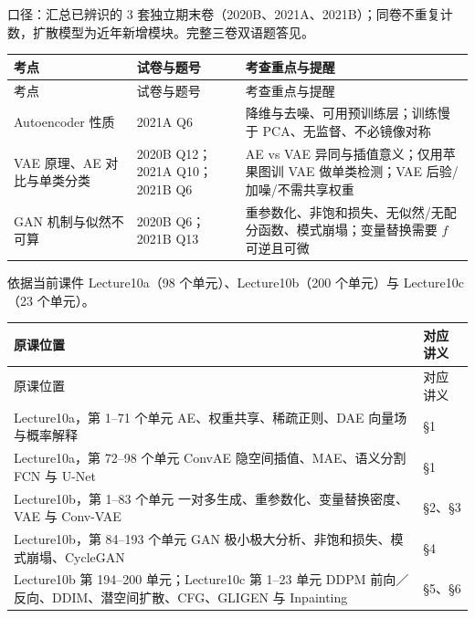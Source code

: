 
口径：汇总已辨识的 3 套独立期末卷（2020B、2021A、2021B）；同卷不重复计数，扩散模型为近年新增模块。完整三卷双语题答见。

\begingroup\small\setlength{\tabcolsep}{3pt}\renewcommand{\arraystretch}{1.22}
\begin{longtable}{@{}>{\raggedright\arraybackslash}p{}>{\raggedright\arraybackslash}p{}>{\raggedright\arraybackslash}p{}@{}}
\toprule
考点 & 试卷与题号 & 考查重点与提醒 \\
\midrule\endfirsthead
考点 & 试卷与题号 & 考查重点与提醒 \\
\midrule\endhead
\bottomrule\endfoot
Autoencoder 性质 & 2021A Q6 & 降维与去噪、可用预训练层；训练慢于 PCA、无监督、不必镜像对称 \\
VAE 原理、AE 对比与单类分类 & 2020B Q12；2021A Q10；2021B Q6 & AE vs VAE 异同与插值意义；仅用苹果图训 VAE 做单类检测；VAE 后验/加噪/不需共享权重 \\
GAN 机制与似然不可算 & 2020B Q6；2021B Q13 & 重参数化、非饱和损失、无似然/无配分函数、模式崩塌；变量替换需要 $f$ 可逆且可微 \\
\end{longtable}\endgroup



依据当前课件 Lecture10a（98 个单元）、Lecture10b（200 个单元）与 Lecture10c（23 个单元）。

\begingroup\small\setlength{\tabcolsep}{3pt}\renewcommand{\arraystretch}{1.22}
\begin{longtable}{@{}>{\raggedright\arraybackslash}p{}>{\raggedright\arraybackslash}p{}@{}}
\toprule
原课位置 & 对应讲义 \\
\midrule\endfirsthead
原课位置 & 对应讲义 \\
\midrule\endhead
\bottomrule\endfoot
Lecture10a，第 1–71 个单元 AE、权重共享、稀疏正则、DAE 向量场与概率解释 & §1 \\
Lecture10a，第 72–98 个单元 ConvAE 隐空间插值、MAE、语义分割 FCN 与 U-Net & §1 \\
Lecture10b，第 1–83 个单元 一对多生成、重参数化、变量替换密度、VAE 与 Conv-VAE & §2、§3 \\
Lecture10b，第 84–193 个单元 GAN 极小极大分析、非饱和损失、模式崩塌、CycleGAN & §4 \\
Lecture10b 第 194–200 单元；Lecture10c 第 1–23 单元 DDPM 前向／反向、DDIM、潜空间扩散、CFG、GLIGEN 与 Inpainting & §5、§6 \\
\end{longtable}\endgroup
